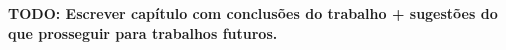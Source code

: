 \documentclass[12pt,
openright, 
oneside, %
a4paper,    %
brazil]{facom-ufu-abntex2}
\begin{document}
\textbf{TODO: Escrever capítulo com conclusões do trabalho + sugestões do que prosseguir para trabalhos futuros.}











\postextual








  



\end{document}
